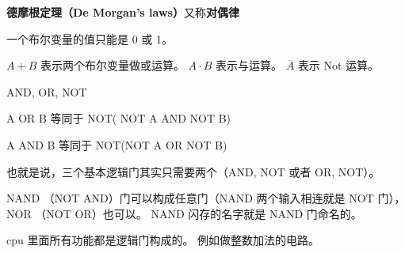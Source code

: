 
\begin{issues}
\issueDraft
\end{issues}

\textbf{德摩根定理（De Morgan's laws）}又称\textbf{对偶律}

一个布尔变量的值只能是 0 或 1。

$A + B$ 表示两个布尔变量做或运算。 $A\cdot B$ 表示与运算。 $\overline A$ 表示 Not 运算。

AND, OR, NOT

A OR B 等同于 NOT( NOT A AND NOT B)

A AND B 等同于 NOT(NOT A OR NOT B)

也就是说，三个基本逻辑门其实只需要两个（AND, NOT 或者 OR, NOT）。

NAND （NOT AND）门可以构成任意门（NAND 两个输入相连就是 NOT 门）， NOR （NOT OR）也可以。 NAND 闪存的名字就是 NAND 门命名的。

cpu 里面所有功能都是逻辑门构成的。 例如做整数加法的电路。
